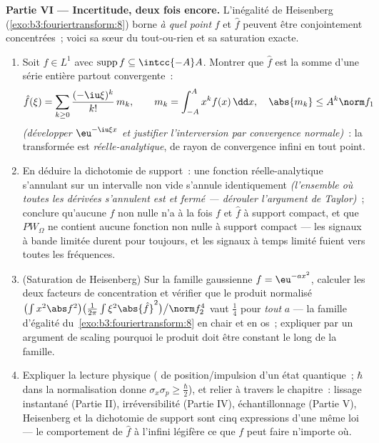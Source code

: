 \begin{problem}[{Problème du week-end --- $\partial_tu =
\partial^2_{xx}u$, résolue de bout en bout}]
\medskip
\noindent\textbf{Partie VI --- Incertitude, deux fois encore.}
L'inégalité de Heisenberg (\cref{exo:b3:fouriertransform:8})
borne \emph{à quel point} $f$ et $\hat f$ peuvent être
conjointement concentrées~; voici sa sœur du tout-ou-rien et
sa saturation exacte.
\begin{enumerate}[resume]
  \item Soit $f \in L^1$ avec $\operatorname{supp}f \subseteq
        \intcc{-A}A$. Montrer que $\hat f$ est la somme d'une
        série entière partout convergente~:
        \[
        \hat f(\xi) = \sum_{k\geq0}\frac{(-\iu\xi)^k}{k!}
        \,m_k, \qquad m_k = \int_{-A}^{A}x^kf(x)\,\dd x,
        \quad \abs{m_k} \leq A^k\norm f_1
        \]
        \emph{(développer $\eu^{-\iu\xi x}$ et justifier
        l'interversion par convergence normale)}~: la
        transformée est \emph{réelle-analytique}, de rayon
        de convergence infini en tout point.
  \item En déduire la dichotomie de support~: une fonction
        réelle-analytique s'annulant sur un intervalle 
        non vide s'annule identiquement \emph{(l'ensemble où
        toutes les dérivées s'annulent est  et fermé ---
        dérouler l'argument de Taylor)}~; conclure qu'aucune
        $f$ non nulle n'a à la fois $f$ et $\hat f$ à support
        compact, et que $PW_\Omega$ ne contient aucune
        fonction non nulle à support compact --- les signaux
        à bande limitée durent pour toujours, et les signaux
        à temps limité fuient vers toutes les fréquences.
  \item (Saturation de Heisenberg) Sur la famille
        gaussienne $f = \eu^{-ax^2}$, calculer les deux
        facteurs de concentration et vérifier que le produit
        normalisé
        $\bigl(\int x^2\abs f^2\bigr)\bigl(\frac1{2\pi}\int
        \xi^2\abs{\hat f}^2\bigr)\big/\norm f_2^4$ vaut
        $\frac14$ pour \emph{tout} $a$ --- la famille
        d'égalité du~\cref{exo:b3:fouriertransform:8} en
        chair et en os~; expliquer par un argument de
        scaling pourquoi le produit doit être constant le
        long de la famille.
  \item Expliquer la lecture physique ( de
        position/impulsion d'un état quantique~; $\hbar$ dans
        la normalisation donne $\sigma_x\sigma_p \geq
        \frac\hbar2$), et relier à travers le chapitre~:
        lissage instantané (Partie II), irréversibilité
        (Partie IV), échantillonnage (Partie V), Heisenberg
        et la dichotomie de support sont cinq expressions
        d'une même loi --- le comportement de $\hat f$ à
        l'infini légifère ce que $f$ peut faire n'importe où.
\end{enumerate}


\end{problem}
